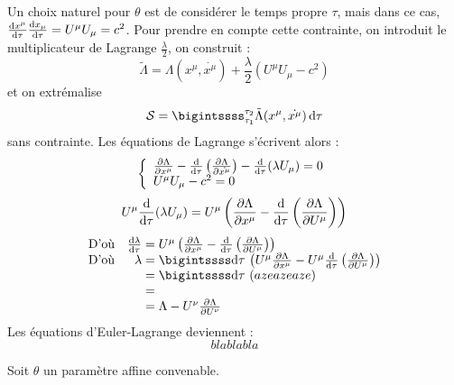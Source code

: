 {\txt Un choix naturel pour $\theta$ est de considérer le temps propre $\tau$, mais dans ce cas, $\frac{\mathrm{d} x^\mu}{\mathrm{d}\tau}\frac{\mathrm{d} x_\mu}{\mathrm{d}\tau}=U^\mu U_\mu=c^2$. Pour prendre en compte cette contrainte, on introduit le multiplicateur de Lagrange $\frac{\lambda}{2}$, on construit :}
$$
	\tilde{\Lambda}=\Lambda(x^\mu,\dot{x^\mu})+\frac{\lambda}{2}(U^\mu U_\mu-c^2)
$$
et on extrémalise 
$$
	\mathcal{S}=\bigintssss_{\tau_1}^{\tau_2} \tilde{\Lambda}(x^\mu,\dot{x^\mu})\,\dif\tau
$$
sans contrainte. Les équations de Lagrange s'écrivent alors :
$$
	\left\{ \begin{array}{l}
		\frac{\partial\Lambda}{\partial x^\mu}-\frac{\mathrm{d}}{\mathrm{d}\tau}\left(\frac{\partial \Lambda}{\partial\dot{x^\mu}}\right)-\frac{\mathrm{d}}{\mathrm{d}\tau}(\lambda U_\mu)=0	\\
		U^\mu U_\mu-c^2=0
	\end{array} \right.
$$
$$
	U^\mu \frac{\mathrm{d}}{\mathrm{d}\tau}(\lambda U_\mu)=U^\mu\left(\frac{\partial\Lambda}{\partial x^\mu}-\frac{\mathrm{d}}{\mathrm{d}\tau}\left(\frac{\partial \Lambda}{\partial U^\mu}\right)\right)
$$
$$
	\begin{array}{lr@{\;}l}
		\text{D'où}&\frac{\dif \lambda}{\dif\tau}&=U^\mu\left(\frac{\partial\Lambda}{\partial x^\mu}-\frac{\dif}{\dif\tau}\left(\frac{\partial \Lambda}{\partial U^\mu}\right)\right)\\
		\text{D'où}&\lambda &=\bigintssss\dif\tau\,\left( U^\mu \frac{\partial\Lambda}{\partial x^\mu}-U^\mu \frac{\dif}{\dif\tau}\left(\frac{\partial \Lambda}{\partial U^\mu}\right)\right)\\
		&&=\bigintssss\dif\tau\,\left(azeazeaze\right)\\
		&&=\\
		&&=\Lambda-U^\nu\frac{\partial \Lambda}{\partial U^\nu}
	\end{array}
$$
Les équations d'Euler-Lagrange deviennent :
$$
	blablabla
$$

Soit $\theta$ un paramètre affine convenable.